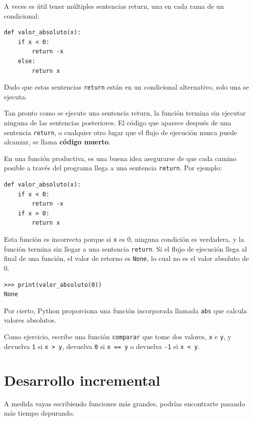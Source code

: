 \documentclass[10pt]{book}
\begin{document}
A veces es útil tener múltiples sentencias return, una en cada
rama de un condicional:

\begin{verbatim}
def valor_absoluto(x):
    if x < 0:
        return -x
    else:
        return x
\end{verbatim}
%
Dado que estas sentencias {\tt return} están en un condicional alternativo,
solo una se ejecuta.

Tan pronto como se ejecute una sentencia return, la función
termina sin ejecutar ninguna de las sentencias posteriores.
El código que aparece después de una sentencia {\tt return}, o cualquier otro lugar
que el flujo de ejecución nunca puede alcanzar, se llama {\bf código muerto}.

En una función productiva, es una buena idea asegurarse de
que cada camino posible a través del programa llega a una
sentencia {\tt return}.  Por ejemplo:

\begin{verbatim}
def valor_absoluto(x):
    if x < 0:
        return -x
    if x > 0:
        return x
\end{verbatim}
%
Esta función es incorrecta porque si {\tt x} es 0,
ninguna condición es verdadera, y la función termina sin llegar a una
sentencia {\tt return}.  Si el flujo de ejecución llega al final
de una función, el valor de retorno es {\tt None}, lo cual no es
el valor absoluto de 0.

\begin{verbatim}
>>> print(valor_absoluto(0))
None
\end{verbatim}
%
Por cierto, Python proporciona una función incorporada llamada
{\tt abs} que calcula valores absolutos.

Como ejercicio, escribe una función {\tt comparar} que
tome dos valores, {\tt x} e {\tt y}, y devuelva {\tt 1} si {\tt x > y},
devuelva {\tt 0} si {\tt x == y} o devuelva {\tt -1} si {\tt x < y}.


\section{Desarrollo incremental}
\label{incremental.development}

A medida vayas escribiendo funciones más grandes, podrías encontrarte
pasando más tiempo depurando.
\end{document}
